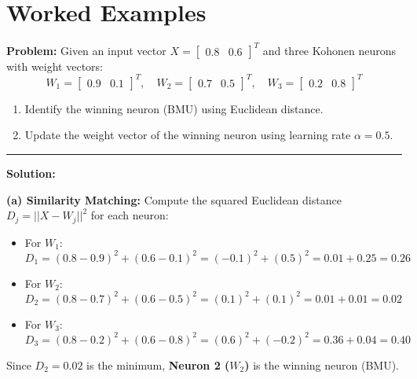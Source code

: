 \documentclass[12pt,a4paper]{article}
\begin{document}
\section{Worked Examples}

\begin{tcolorbox}[examplebox, title={Kohonen SOM Winning Neuron and Weight Update}]
\textbf{Problem:} Given an input vector $X = \begin{bmatrix} 0.8 & 0.6 \end{bmatrix}^T$ and three Kohonen neurons with weight vectors:
\begin{equation*}
  W_1 = \begin{bmatrix} 0.9 & 0.1 \end{bmatrix}^T, \quad W_2 = \begin{bmatrix} 0.7 & 0.5 \end{bmatrix}^T, \quad W_3 = \begin{bmatrix} 0.2 & 0.8 \end{bmatrix}^T
\end{equation*}
\begin{enumerate}[label=(\alph*), leftmargin=*, itemsep=2.5pt]
  \item Identify the winning neuron (BMU) using Euclidean distance.
  \item Update the weight vector of the winning neuron using learning rate $\alpha = 0.5$.
\end{enumerate}
\par\vspace{4pt}\noindent\rule{\linewidth}{0.5pt}\par
\textbf{Solution:}

\textbf{(a) Similarity Matching:}
Compute the squared Euclidean distance $D_j = ||X - W_j||^2$ for each neuron:
\begin{itemize}[leftmargin=*, itemsep=2pt]
  \item For $W_1$:
    \begin{equation*}
      D_1 = (0.8 - 0.9)^2 + (0.6 - 0.1)^2 = (-0.1)^2 + (0.5)^2 = 0.01 + 0.25 = 0.26
    \end{equation*}
  \item For $W_2$:
    \begin{equation*}
      D_2 = (0.8 - 0.7)^2 + (0.6 - 0.5)^2 = (0.1)^2 + (0.1)^2 = 0.01 + 0.01 = 0.02
    \end{equation*}
  \item For $W_3$:
    \begin{equation*}
      D_3 = (0.8 - 0.2)^2 + (0.6 - 0.8)^2 = (0.6)^2 + (-0.2)^2 = 0.36 + 0.04 = 0.40
    \end{equation*}
\end{itemize}
Since $D_2 = 0.02$ is the minimum, \textbf{Neuron 2 ($W_2$)} is the winning neuron (BMU).


\end{tcolorbox}
\end{document}
